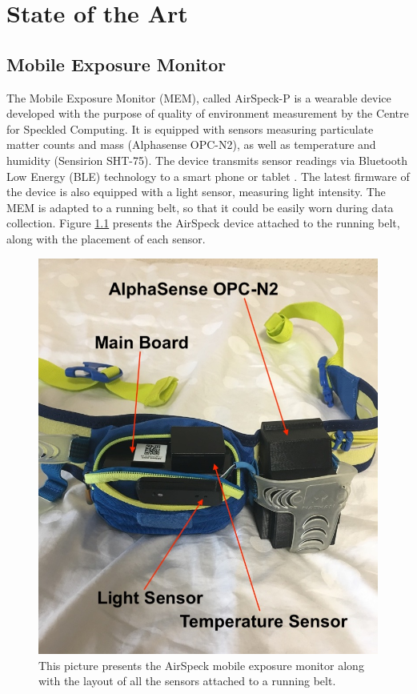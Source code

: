 \documentclass[bsc,frontabs,twoside,singlespacing, parskip,deptreport]{infthesis}     %
\begin{document}
\chapter{State of the Art}

\section{Mobile Exposure Monitor}

The Mobile Exposure Monitor (MEM), called AirSpeck-P is a wearable device developed with the purpose of quality of environment measurement by the Centre for Speckled Computing. It is equipped with sensors measuring particulate matter counts and mass (Alphasense OPC-N2), as well as temperature and humidity (Sensirion SHT-75). The device transmits sensor readings via Bluetooth Low Energy (BLE) technology to a smart phone or tablet \cite{airspeck}. The latest firmware of the device is also equipped with a light sensor, measuring light intensity. The MEM is adapted to a running belt, so that it could be easily worn during data collection. Figure \ref{fig:airspeck} presents the AirSpeck device attached to the running belt, along with the placement of each sensor.

\begin{figure}[h!]
  \center
  \includegraphics[width=\columnwidth]{airspeck.jpeg} 
  \caption{This picture presents the AirSpeck mobile exposure monitor along with the layout of all the sensors attached to a running belt.}
  \label{fig:airspeck}
\end{figure}
\end{document}
